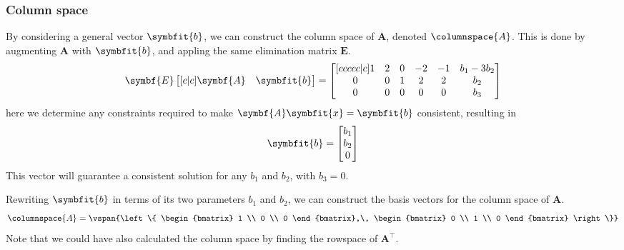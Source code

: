 \documentclass{article}
\begin{document}
\subsubsection{Column space}
By considering a general vector \(\symbfit{b}\), we can construct the column space of \(\symbf{A}\), denoted \(\columnspace{A}\).
This is done by augmenting \(\symbf{A}\) with \(\symbfit{b}\), and appling the same elimination matrix \(\symbf{E}\).
\begin{equation*}
    \symbf{E}
    \begin{bmatrix}[c|c]
        \symbf{A} & \symbfit{b}
    \end{bmatrix} =
    \begin{bmatrix}[ccccc|c]
        1 & 2 & 0 & -2 & -1 & b_1 - 3b_2 \\
        0 & 0 & 1 & 2  & 2  & b_2        \\
        0 & 0 & 0 & 0  & 0  & b_3
    \end{bmatrix}
\end{equation*}
here we determine any constraints required to make \(\symbf{A}\symbfit{x} = \symbfit{b}\)
consistent, resulting in
\begin{equation*}
    \symbfit{b} =
    \begin{bmatrix}
        b_1 \\
        b_2 \\
        0
    \end{bmatrix}
\end{equation*}
This vector will guarantee a consistent solution for any \(b_1\) and \(b_2\), with \(b_3 = 0\).

Rewriting \(\symbfit{b}\) in terms of its two parameters \(b_1\) and \(b_2\),
we can construct the basis vectors for the column space of \(\symbf{A}\).
\begin{equation*}
    \columnspace{A} =
    \vspan{\left\{
        \begin{bmatrix}
            1 \\
            0 \\
            0
        \end{bmatrix},\,
        \begin{bmatrix}
            0 \\
            1 \\
            0
        \end{bmatrix}
        \right\}}
\end{equation*}
Note that we could have also calculated the column space by finding the rowspace of \(\symbf{A}^\top\).
\end{document}
